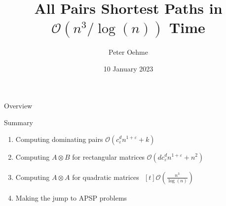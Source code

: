 

\author{Peter Oehme}
\title{All Pairs Shortest Paths in \texorpdfstring{$\mathcal{O}(n^3 / \log(n))$}{O (n \^{} 3 / log (n))} Time}
\date{10 January 2023}




\begin{frame}
    \maketitle
\end{frame}

\begin{frame}{Overview}
    \tableofcontents
\end{frame}







\begin{frame}{Summary}
    \begin{enumerate}
        \item Computing dominating pairs $\mathcal{O}\left( c_\varepsilon^d n^{1 + \varepsilon} + k \right)$
        \item<2-> Computing $A \otimes B$ for rectangular matrices $\mathcal{O}\left( d c_\varepsilon^d n^{1 + \varepsilon} + n^2 \right)$
        \item<3-> Computing $A \otimes A$ for quadratic matrices $\begin{aligned}[t]\mathcal{O}\left( \frac{n^3}{\log(n)} \right)\end{aligned}$
        \item<4-> Making the jump to APSP problems
    \end{enumerate}

\end{frame}


